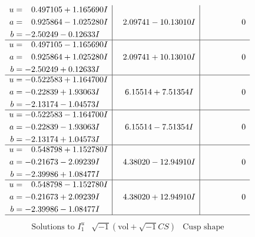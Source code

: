\documentclass[1p]{elsarticle_modified}
\theoremstyle{definition}
\newcommand{\I}{\sqrt{-1}}
\begin{document}
$$\begin{array}{c|c|c}
\begin{aligned}
u &= \phantom{-}0.497105 + 1.165690 I \\
a &= \phantom{-}0.925864 - 1.025280 I \\
b &= -2.50249 - 0.12633 I\end{aligned}
 & \phantom{-}2.09741 - 10.13010 I & \phantom{-0.000000 } 0 \\ \hline\begin{aligned}
u &= \phantom{-}0.497105 - 1.165690 I \\
a &= \phantom{-}0.925864 + 1.025280 I \\
b &= -2.50249 + 0.12633 I\end{aligned}
 & \phantom{-}2.09741 + 10.13010 I & \phantom{-0.000000 } 0 \\ \hline\begin{aligned}
u &= -0.522583 + 1.164700 I \\
a &= -0.22839 + 1.93063 I \\
b &= -2.13174 - 1.04573 I\end{aligned}
 & \phantom{-}6.15514 + 7.51354 I & \phantom{-0.000000 } 0 \\ \hline\begin{aligned}
u &= -0.522583 - 1.164700 I \\
a &= -0.22839 - 1.93063 I \\
b &= -2.13174 + 1.04573 I\end{aligned}
 & \phantom{-}6.15514 - 7.51354 I & \phantom{-0.000000 } 0 \\ \hline\begin{aligned}
u &= \phantom{-}0.548798 + 1.152780 I \\
a &= -0.21673 - 2.09239 I \\
b &= -2.39986 + 1.08477 I\end{aligned}
 & \phantom{-}4.38020 - 12.94910 I & \phantom{-0.000000 } 0 \\ \hline\begin{aligned}
u &= \phantom{-}0.548798 - 1.152780 I \\
a &= -0.21673 + 2.09239 I \\
b &= -2.39986 - 1.08477 I\end{aligned}
 & \phantom{-}4.38020 + 12.94910 I & \phantom{-0.000000 } 0\\
 \hline 
 \end{array}$$\newpage$$\begin{array}{c|c|c}  
\text{Solutions to }I^u_{1}& \I (\text{vol} + \sqrt{-1}CS) & \text{Cusp shape}\\
 \hline 
\begin{aligned}

\end{aligned}
\end{array}$$
\end{document}
